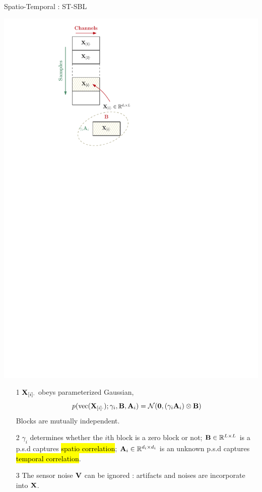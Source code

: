 \documentclass[notheorems,table]{beamer}
\begin{document}
\begin{frame}{Spatio-Temporal : ST-SBL}

    \begin{minipage}{.3\linewidth}
        \includegraphics[width=\linewidth]{st-sbl_model}
    \end{minipage}
    \begin{minipage}{.68\linewidth}
        \begin{itemize}
            \item[1] $\mathbf{X}_{[i]\cdot}$ obeys parameterized Gaussian,
                \[
                    p(\mathrm{vec}(\mathbf{X}_{[i]\cdot});\gamma_i,\mathbf{B},\mathbf{A}_i) = \mathcal{N}(\mathbf{0},(\gamma_i\mathbf{A}_i)\otimes\mathbf{B})
                \]
                Blocks are mutually independent.
            \item[2] $\gamma_i$ determines whether the $i$th block is a zero block or not; $\mathbf{B}\in\mathbb{R}^{L\times L}$ is a p.s.d captures \hl{spatio correlation}; $\mathbf{A}_i\in\mathbb{R}^{d_i\times d_i}$ is an unknown p.s.d captures \hl{temporal correlation}.
            \item[3] The sensor noise $\mathbf{V}$ can be ignored : artifacts and noises are incorporate into $\mathbf{X}$.
        \end{itemize}
    \end{minipage}

\end{frame}
\end{document}
